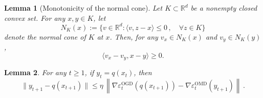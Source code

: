 \documentclass[10pt,a4paper]{amsart}
\newtheorem{lemma}{Lemma}
\begin{document}
\begin{lemma}[Monotonicity of the normal cone]
\label{lem:normal-cone-monotonicity}
Let \(K\subset \mathbb R^d\) be a nonempty closed convex set. For any
\(x,y\in K\), let
\[
N_K(x):=\{v\in\mathbb R^d:\langle v,z-x\rangle\le 0
\,, \quad \forall z\in K\}
\]
denote the normal cone of \(K\) at \(x\). Then, for any
\(v_x\in N_K(x)\) and \(v_y\in N_K(y)\),
\[
\langle v_x-v_y,x-y\rangle \ge 0.
\]
\end{lemma}

\begin{lemma} 
\label{lem:dist-minimizers-eta-times-norm}
For any $t \geq 1$, if $y_t = q(x_t)$, then 
\begin{equation*}
\|y_{t+1} - q(x_{t+1})\| \le \eta\,
\left\|\nabla\varepsilon_t^{\mathrm{OGD}}(q(x_{t+1})) - \nabla\varepsilon_t^{\mathrm{OMD}}(y_{t+1})\right\|\,.
\end{equation*}
\end{lemma}
\end{document}
